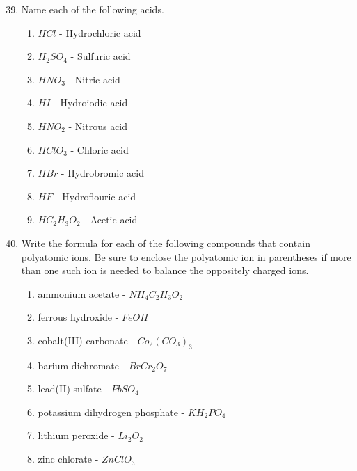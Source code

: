 \documentclass[12pt,letterpaper]{article}
\begin{document}
\begin{enumerate}
\setcounter{enumi}{38} %
\item 

Name each of the following acids.

\begin{enumerate}
\item $HCl$ - Hydrochloric acid\\
\item $H_2SO_4$ - Sulfuric acid\\
\item $HNO_3$ - Nitric acid\\
\item $HI$ - Hydroiodic acid\\
\item $HNO_2$ - Nitrous acid\\
\item $HClO_3$ - Chloric acid\\
\item $HBr$ - Hydrobromic acid\\
\item $HF$ - Hydroflouric acid\\
\item $HC_2H_3O_2$ - Acetic acid\\
\end{enumerate}

\setcounter{enumi}{45} %
\item 

Write the formula for each of the following compounds that contain polyatomic ions. Be sure to enclose the polyatomic ion in parentheses if more than one such ion is needed to balance the oppositely charged ions.

\begin{enumerate}
\item ammonium acetate - $NH_4C_2H_3O_2$\\
\item ferrous hydroxide - $FeOH$\\
\item cobalt(III) carbonate - $Co_2(CO_3)_3$\\
\item barium dichromate - $BrCr_2O_7$\\
\item lead(II) sulfate - $PbSO_4$\\
\item potassium dihydrogen phosphate - $KH_2PO_4$\\
\item lithium peroxide - $Li_2O_2$\\
\item zinc chlorate - $ZnClO_3$
\end{enumerate}

\end{enumerate}
\end{document}
